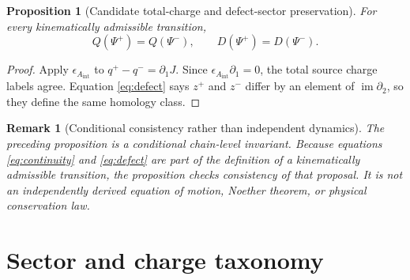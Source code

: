 \documentclass[11pt]{article}
\newtheorem{proposition}{Proposition}
\newtheorem{remark}{Remark}
\newcommand{\Aint}{A_{\mathrm{int}}}
\begin{document}
\begin{proposition}[Candidate total-charge and defect-sector preservation]
For every kinematically admissible transition,
\[
  Q(\Psi^+)=Q(\Psi^-),\qquad
  D(\Psi^+)=D(\Psi^-).
\]
\end{proposition}

\begin{proof}
Apply \(\epsilon_{\Aint}\) to
\(q^+-q^-=\partial_1J\). Since
\(\epsilon_{\Aint}\partial_1=0\), the total source charge labels agree.
Equation \eqref{eq:defect} says \(z^+\) and \(z^-\) differ by an element of
\(\operatorname{im}\partial_2\), so they define the same homology class.
\end{proof}

\begin{remark}[Conditional consistency rather than independent dynamics]
The preceding proposition is a conditional chain-level invariant. Because
equations \eqref{eq:continuity} and \eqref{eq:defect} are part of the
definition of a kinematically admissible transition, the proposition checks
consistency of that proposal. It is not an independently derived equation of
motion, Noether theorem, or physical conservation law.
\end{remark}

\section{Sector and charge taxonomy}
\end{document}
